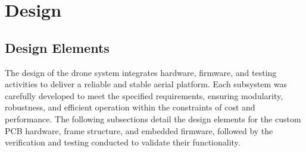 \section{Design}


\pagebreak

\subsection{Design Elements}
\label{sec:design-elements}

The design of the drone system integrates hardware, firmware, and testing activities to deliver a reliable and stable aerial platform. Each subsystem was carefully developed to meet the specified requirements, ensuring modularity, robustness, and efficient operation within the constraints of cost and performance. The following subsections detail the design elements for the custom PCB hardware, frame structure, and embedded firmware, followed by the verification and testing conducted to validate their functionality.


\pagebreak




\pagebreak




